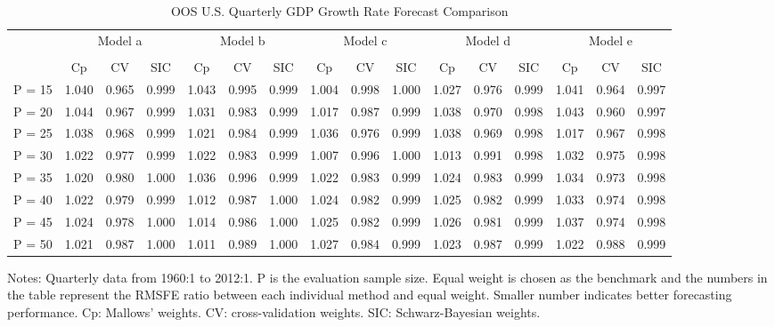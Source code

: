 \begin{table}
    \caption{OOS U.S. Quarterly GDP Growth Rate Forecast Comparison} \label{ntb:3}
    \centering
    \begin{adjustbox}{width=\textwidth,totalheight=\textheight,keepaspectratio}
    \begin{threeparttable}
    \begin{tabular}{lccccccccccccccc}
    \toprule
     & \multicolumn{3}{c}{Model a} & \multicolumn{3}{c}{Model b} & \multicolumn{3}{c}{Model c} & \multicolumn{3}{c}{Model d} & \multicolumn{3}{c}{Model e}\\%
    \cmidrule(r){2-4}
    \cmidrule(r){5-7}
    \cmidrule(r){8-10}
    \cmidrule(r){11-13}
    \cmidrule(r){14-16}\\
           & Cp    & CV    & SIC  & Cp    & CV    & SIC & Cp    & CV    & SIC & Cp    & CV    & SIC & Cp    & CV    & SIC \\
    P = 15 & 1.040 & 0.965 & 0.999& 1.043 & 0.995 &0.999& 1.004 & 0.998 &1.000& 1.027 & 0.976 &0.999& 1.041 & 0.964 &0.997 \\
    P = 20 & 1.044 & 0.967 & 0.999& 1.031 & 0.983 &0.999& 1.017 & 0.987 &0.999& 1.038 & 0.970 &0.998& 1.043 & 0.960 &0.997 \\
    P = 25 & 1.038 & 0.968 & 0.999& 1.021 & 0.984 &0.999& 1.036 & 0.976 &0.999& 1.038 & 0.969 &0.998& 1.017 & 0.967 &0.998 \\
    P = 30 & 1.022 & 0.977 & 0.999& 1.022 & 0.983 &0.999& 1.007 & 0.996 &1.000& 1.013 & 0.991 &0.998& 1.032 & 0.975 &0.998 \\
    P = 35 & 1.020 & 0.980 & 1.000& 1.036 & 0.996 &0.999& 1.022 & 0.983 &0.999& 1.024 & 0.983 &0.999& 1.034 & 0.973 &0.998 \\
    P = 40 & 1.022 & 0.979 & 0.999& 1.012 & 0.987 &1.000& 1.024 & 0.982 &0.999& 1.025 & 0.982 &0.999& 1.033 & 0.974 &0.998 \\
    P = 45 & 1.024 & 0.978 & 1.000& 1.014 & 0.986 &1.000& 1.025 & 0.982 &0.999& 1.026 & 0.981 &0.999& 1.037 & 0.974 &0.998 \\
    P = 50 & 1.021 & 0.987 & 1.000& 1.011 & 0.989 &1.000& 1.027 & 0.984 &0.999& 1.023 & 0.987 &0.999& 1.022 & 0.988 &0.999 \\
    \bottomrule
    \end{tabular}
    \begin{tablenotes} \footnotesize
    Notes: Quarterly data from 1960:1 to 2012:1. $\mathrm{P}$ is the evaluation sample size. Equal weight is chosen as the benchmark and the numbers in the table represent the RMSFE ratio between each individual method and equal weight. Smaller number indicates better forecasting performance. Cp: Mallows' weights. CV: cross-validation weights. SIC: Schwarz-Bayesian weights.

\end{tablenotes}
\end{threeparttable}
\end{adjustbox}
\end{table}

